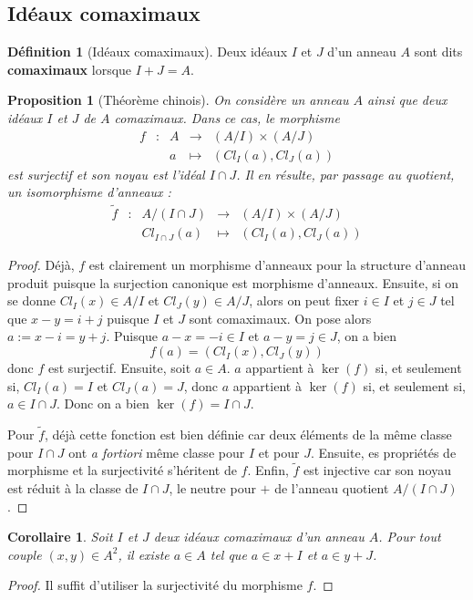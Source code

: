 \documentclass[french]{book}
\theoremstyle{plain}
\newtheorem{prop}{Proposition}[chapter]
\newtheorem{cor}{Corollaire}[chapter]
\theoremstyle{definition}
\newtheorem{dfn}{Définition}[chapter]
\theoremstyle{remark}
\begin{document}
\subsection{Idéaux comaximaux}
\begin{dfn}[Idéaux comaximaux]
	Deux idéaux $I$ et $J$ d'un anneau $A$ sont dits \textbf{comaximaux} lorsque $I+J=A$.
\end{dfn}
\begin{prop}[Théorème chinois]
	On considère un anneau $A$ ainsi que deux idéaux $I$ et $J$ de $A$ comaximaux. Dans ce cas, le morphisme $$\begin{array}{ccccc}f&:&A&\rightarrow&(A/I)\times(A/J)\\ &&a&\mapsto&(Cl_I(a),Cl_J(a))\end{array}$$ est surjectif et son noyau est l'idéal $I\cap J$. Il en résulte, par passage au quotient, un isomorphisme d'anneaux : $$\begin{array}{ccccc}\tilde{f}&:&A/(I\cap J)&\rightarrow&(A/I)\times(A/J)\\ &&Cl_{I\cap J}(a)&\mapsto&(Cl_I(a),Cl_J(a))\end{array}$$
\end{prop}
\begin{proof}
	Déjà, $f$ est clairement un morphisme d'anneaux pour la structure d'anneau produit puisque la surjection canonique est morphisme d'anneaux. Ensuite, si on se donne $Cl_I(x)\in A/I$ et $Cl_J(y)\in A/J$, alors on peut fixer $i\in I$ et $j\in J$ tel que $x-y=i+j$ puisque $I$ et $J$ sont comaximaux. On pose alors $a:=x-i=y+j$. Puisque $a-x=-i\in I$ et $a-y=j\in J$, on a bien $$f(a)=(Cl_I(x),Cl_J(y))$$ donc $f$ est surjectif. Ensuite, soit $a\in A$. $a$ appartient à $\ker(f)$ si, et seulement si, $Cl_I(a)=I$ et $Cl_J(a)=J$, donc $a$ appartient à $\ker(f)$ si, et seulement si, $a\in I\cap J$. Donc on a bien $\ker(f)=I\cap J$. \\ \par Pour $\tilde{f}$, déjà cette fonction est bien définie car deux éléments de la même classe pour $I\cap J$ ont \textit{a fortiori} même classe pour $I$ et pour $J$. Ensuite, es propriétés de morphisme et la surjectivité s'héritent de $f$. Enfin, $\tilde{f}$ est injective car son noyau est réduit à la classe de $I\cap J$, le neutre pour $+$ de l'anneau quotient $A/(I\cap J)$.
\end{proof}
\begin{cor}
	Soit $I$ et $J$ deux idéaux comaximaux d'un anneau $A$. Pour tout couple $(x,y)\in A^2$, il existe $a\in A$ tel que $a\in x+I$ et $a\in y+J$.
\end{cor}
\begin{proof}
	Il suffit d'utiliser la surjectivité du morphisme $f$.
\end{proof}
\end{document}
